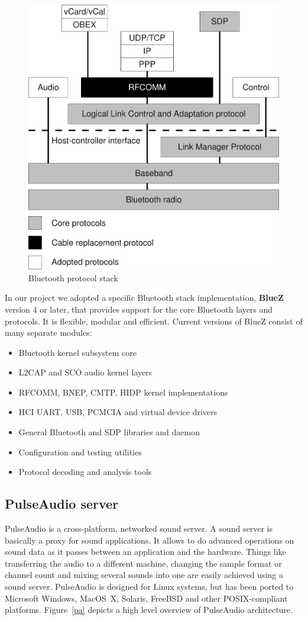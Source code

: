 \documentclass[conference]{IEEEtran}
\begin{document}
\begin{figure}[h]
\centering
\includegraphics[width=0.9\columnwidth]{BTstack}
\caption{Bluetooth protocol stack}
\label{btstack}
\end{figure}

In our project we adopted a specific Bluetooth stack implementation, \textbf{BlueZ} version 4 or later, that provides support for the core Bluetooth layers and protocols. It is flexible, modular and efficient. Current versions of BlueZ consist of many separate modules:
\begin{itemize}
\item Bluetooth kernel subsystem core
\item L2CAP and SCO audio kernel layers
\item RFCOMM, BNEP, CMTP, HIDP kernel implementations
\item HCI UART, USB, PCMCIA and virtual device drivers
\item General Bluetooth and SDP libraries and daemon
\item Configuration and testing utilities
\item Protocol decoding and analysis tools
\end{itemize}

\subsection{PulseAudio server}
PulseAudio is a cross-platform, networked sound server. A sound server is basically a proxy for sound applications. It allows to do advanced operations on sound data as it passes between an application and the hardware. Things like transferring the audio to a different machine, changing the sample format or channel count and mixing several sounds into one are easily achieved using a sound server. PulseAudio is designed for Linux systems, but has been ported to Microsoft Windows, MacOS~X, Solaris, FreeBSD and other POSIX-compliant platforms. Figure~\ref{pa} depicts a high level overview of PulseAudio architecture.
\end{document}
